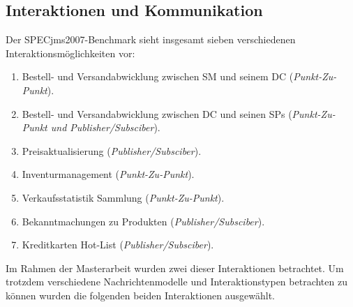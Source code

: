 \subsection{Interaktionen und Kommunikation}
Der SPECjms2007-Benchmark sieht insgesamt sieben verschiedenen Interaktionsmöglichkeiten vor: 
\begin{enumerate}
    \item Bestell- und Versandabwicklung zwischen SM und seinem DC (\emph{Punkt-Zu-Punkt}).
    \item Bestell- und Versandabwicklung zwischen DC und seinen SPs (\emph{Punkt-Zu-Punkt und Publisher/Subsciber}).
    \item Preisaktualisierung (\emph{Publisher/Subsciber}).
    \item Inventurmanagement (\emph{Punkt-Zu-Punkt}).
    \item Verkaufsstatistik Sammlung (\emph{Punkt-Zu-Punkt}).
    \item Bekanntmachungen zu Produkten (\emph{Publisher/Subsciber}).
    \item Kreditkarten Hot-List (\emph{Publisher/Subsciber}).
    
\end{enumerate}
Im Rahmen der Masterarbeit wurden zwei dieser Interaktionen betrachtet. Um trotzdem verschiedene Nachrichtenmodelle und Interaktionstypen betrachten zu können wurden die folgenden beiden Interaktionen ausgewählt.
